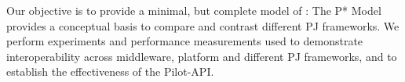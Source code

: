\documentclass{sig-alternate}
\begin{document}

Our objective is to provide a minimal, but complete model of
\pilotjobs: The P* Model provides a conceptual basis to compare and
contrast different PJ frameworks.  We perform experiments and
performance measurements used to demonstrate interoperability across
middleware, platform and different PJ frameworks, and to establish the
effectiveness of the Pilot-API.








\end{document}
